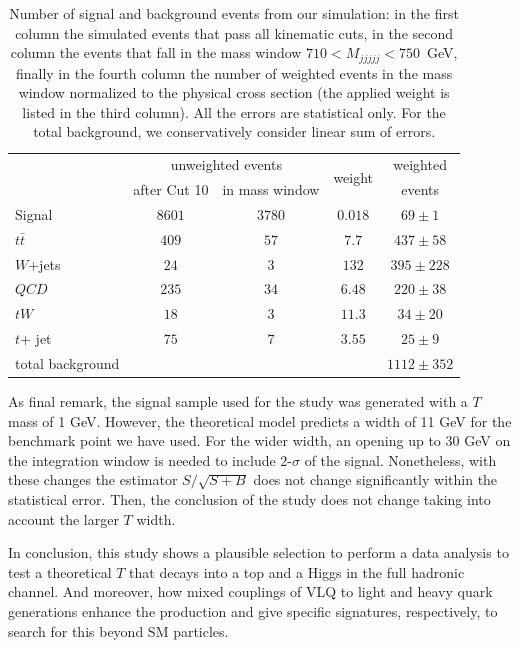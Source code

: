 \begin{table}[tb]
\begin{center}
\begin{tabular}{l|c|c|c|c}
 & \multicolumn{2}{c|}{unweighted events}  & \multirow{2}{*}{weight} & weighted  \\
 & after Cut 10 & in mass window & & events \\
 \hline
 Signal & $8601$ & $3780$ & $0.018$ &$69 \pm 1$ \\
 \hline
   $t \bar{t}$ & $409$ & $57$ & $7.7$ & $437 \pm 58$ \\
 $W$+jets & $24$ & $3$ & $132$ & $395 \pm 228$ \\
 $QCD$ & $235$ & $34$ & $6.48$ & $220 \pm 38$ \\
 $tW$ & $18$ & $3$ & $11.3$ & $34 \pm 20$ \\
 $t$+ jet & $75$ & $7$ & $3.55$ & $25 \pm 9$ \\
  \hline
  total background & & & & $1112 \pm 352$ \\
\end{tabular}
\caption{Number of signal and background events from our simulation: in the first column the simulated events that pass all kinematic cuts, in the second column the events that fall in the mass window $710 < M_{jjjjj} < 750$~GeV, finally in the fourth column the number of weighted events in the mass window normalized to the physical cross section (the applied weight is listed in the third column). All the errors are statistical only. For the total background, we conservatively consider linear sum of errors.} \label{tab:events} 
\end{center}
\end{table}

As final remark, the signal sample used for the study was generated with a $T$ mass of 1 GeV. However, the theoretical model predicts a width of 11 GeV for the benchmark point we have used. For the wider width, an opening up to 30 GeV on the integration window is needed to include 2-$\sigma$ of the signal. Nonetheless, with these changes the estimator $S/\sqrt{S+B}$ does not change significantly within the statistical error. Then, the conclusion of the study does not change taking into account the larger $T$ width.

In conclusion, this study shows a plausible selection to perform a data analysis to test a theoretical $T$ that decays into a top and a Higgs in the full hadronic channel. And moreover, how mixed couplings of VLQ to light and heavy quark generations enhance the production and give specific signatures, respectively, to search for this beyond SM particles. 

